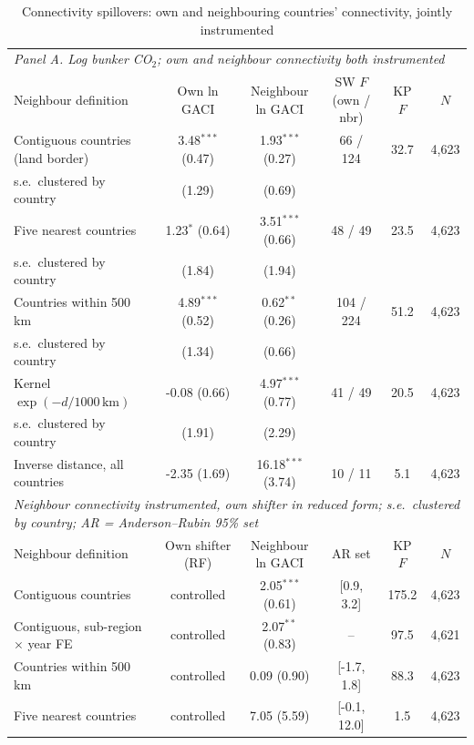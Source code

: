 \begin{table}[htbp]
\centering
\begin{threeparttable}
\caption{Connectivity spillovers: own and neighbouring countries' connectivity, jointly instrumented}
\label{tab:spillover}
\footnotesize
\begin{tabular}{lccccc}
\toprule
\multicolumn{6}{l}{\textit{Panel A. Log bunker CO$_2$; own and neighbour connectivity both instrumented}} \\
Neighbour definition & Own ln GACI & Neighbour ln GACI & SW $F$ (own / nbr) & KP $F$ & $N$ \\
\midrule
  Contiguous countries (land border) & 3.48$^{***}$ (0.47) & 1.93$^{***}$ (0.27) & 66 / 124 & 32.7 & 4,623 \\
  \quad s.e.\ clustered by country & (1.29) & (0.69) & & & \\
  Five nearest countries & 1.23$^{*}$ (0.64) & 3.51$^{***}$ (0.66) & 48 / 49 & 23.5 & 4,623 \\
  \quad s.e.\ clustered by country & (1.84) & (1.94) & & & \\
  Countries within 500 km & 4.89$^{***}$ (0.52) & 0.62$^{**}$ (0.26) & 104 / 224 & 51.2 & 4,623 \\
  \quad s.e.\ clustered by country & (1.34) & (0.66) & & & \\
  Kernel $\exp(-d/1000\,\mathrm{km})$ & -0.08 (0.66) & 4.97$^{***}$ (0.77) & 41 / 49 & 20.5 & 4,623 \\
  \quad s.e.\ clustered by country & (1.91) & (2.29) & & & \\
  Inverse distance, all countries & -2.35 (1.69) & 16.18$^{***}$ (3.74) & 10 / 11 & 5.1 & 4,623 \\
\midrule
\multicolumn{6}{l}{\textit{Neighbour connectivity instrumented, own shifter in reduced form; s.e.\ clustered by country; AR = Anderson--Rubin 95\% set}} \\
Neighbour definition & Own shifter (RF) & Neighbour ln GACI & AR set & KP $F$ & $N$ \\
  Contiguous countries & controlled & 2.05$^{***}$ (0.61) & [0.9, 3.2] & 175.2 & 4,623 \\
  Contiguous, sub-region $\times$ year FE & controlled & 2.07$^{**}$ (0.83) & -- & 97.5 & 4,621 \\
  Countries within 500 km & controlled & 0.09 (0.90) & [-1.7, 1.8] & 88.3 & 4,623 \\
  Five nearest countries & controlled & 7.05 (5.59) & [-0.1, 12.0] & 1.5 & 4,623 \\

\end{tabular}
\end{threeparttable}
\end{table}
